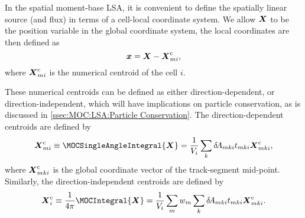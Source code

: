 {{{            In the spatial moment-base \ac{LSA}, it is convenient to define the spatially linear source (and flux) in terms of a cell-local coordinate system.
            We allow $\boldsymbol{X}$ to be the position variable in the global coordinate system, the local coordinates are then defined as
            \begin{equation}\label{eq:MOC:LSA:Global to Local Coordinates}
                \loc = \Loc - \centroid[\Loc][mi],
            \end{equation}
            where $\centroid[\Loc][mi]$ is the numerical centroid of the cell $i$.

            These numerical centroids can be defined as either direction-dependent, or direction-independent, which will have implications on particle conservation, as is discussed in \cref{ssec:MOC:LSA:Particle Conservation}.
            The direction-dependent centroids are defined by
            \begin{equation}\label{eq:MOC:LSA:Direction-Dependent Centroids}
                \centroid[\Loc][mi] \defined \MOCSingleAngleIntegral{\Loc} = \frac{1}{V_i}\suml[k]\tA[mki]\nsegl\locCent[\Loc],
            \end{equation}
            where $\locCent[\Loc]$ is the global coordinate vector of the track-segment mid-point.
            Similarly, the direction-independent centroids are defined by
            \begin{equation}\label{eq:MOC:LSA:Direction-Independent Centroids}
                \centroid[\Loc][i] \defined \rfourpi\MOCIntegral{\Loc} = \frac{1}{V_i}\suml[m]\wt\suml[k]\tA[mki]\nsegl\locCent[\Loc].
            \end{equation}

}}}
